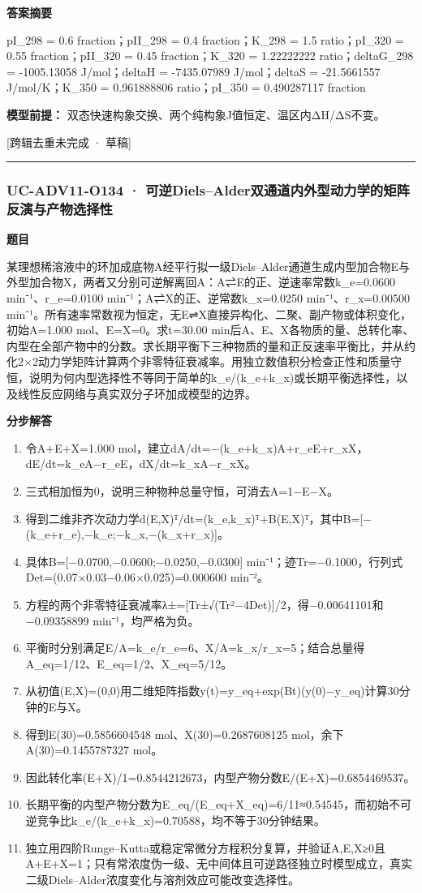 \documentclass[UTF8,11pt,a4paper]{ctexart}
\begin{document}
\noindent\textbf{答案摘要}\par
pI\_298 = 0.6 fraction；pII\_298 = 0.4 fraction；K\_298 = 1.5 ratio；pI\_320 = 0.55 fraction；pII\_320 = 0.45 fraction；K\_320 = 1.22222222 ratio；deltaG\_298 = -1005.13058 J/mol；deltaH = -7435.07989 J/mol；deltaS = -21.5661557 J/mol/K；K\_350 = 0.961888806 ratio；pI\_350 = 0.490287117 fraction\par
\noindent\textbf{模型前提：}
双态快速构象交换、两个纯构象J值恒定、温区内ΔH/ΔS不变。\par
\noindent\textcolor{red!65!black}{[跨辑去重未完成 · 草稿]} \par
\medskip\hrule\medskip
{}
\subsubsection*{UC-ADV11-O134 · 可逆Diels–Alder双通道内外型动力学的矩阵反演与产物选择性}
\noindent\textbf{题目}\par
某理想稀溶液中的环加成底物A经平行拟一级Diels–Alder通道生成内型加合物E与外型加合物X，两者又分别可逆解离回A：A⇌E的正、逆速率常数k\_e=0.0600 min⁻¹、r\_e=0.0100 min⁻¹；A⇌X的正、逆常数k\_x=0.0250 min⁻¹、r\_x=0.00500 min⁻¹。所有速率常数视为恒定，无E⇌X直接异构化、二聚、副产物或体积变化，初始A=1.000 mol、E=X=0。求t=30.00 min后A、E、X各物质的量、总转化率、内型在全部产物中的分数。求长期平衡下三种物质的量和正反速率平衡比，并从约化2×2动力学矩阵计算两个非零特征衰减率。用独立数值积分检查正性和质量守恒，说明为何内型选择性不等同于简单的k\_e/(k\_e+k\_x)或长期平衡选择性，以及线性反应网络与真实双分子环加成模型的边界。\par
\medskip\noindent\textbf{分步解答}
\begin{enumerate}
\item 令A+E+X=1.000 mol，建立dA/dt=−(k\_e+k\_x)A+r\_eE+r\_xX，dE/dt=k\_eA−r\_eE，dX/dt=k\_xA−r\_xX。
\item 三式相加恒为0，说明三种物种总量守恒，可消去A=1−E−X。
\item 得到二维非齐次动力学d(E,X)ᵀ/dt=(k\_e,k\_x)ᵀ+B(E,X)ᵀ，其中B=[−(k\_e+r\_e),−k\_e;−k\_x,−(k\_x+r\_x)]。
\item 具体B=[−0.0700,−0.0600;−0.0250,−0.0300] min⁻¹；迹Tr=−0.1000，行列式Det=(0.07×0.03−0.06×0.025)=0.000600 min⁻²。
\item 方程的两个非零特征衰减率λ±=[Tr±√(Tr²−4Det)]/2，得−0.00641101和−0.09358899 min⁻¹，均严格为负。
\item 平衡时分别满足E/A=k\_e/r\_e=6、X/A=k\_x/r\_x=5；结合总量得A\_eq=1/12、E\_eq=1/2、X\_eq=5/12。
\item 从初值(E,X)=(0,0)用二维矩阵指数y(t)=y\_eq+exp(Bt)(y(0)−y\_eq)计算30分钟的E与X。
\item 得到E(30)=0.5856604548 mol、X(30)=0.2687608125 mol，余下A(30)=0.1455787327 mol。
\item 因此转化率(E+X)/1=0.8544212673，内型产物分数E/(E+X)=0.6854469537。
\item 长期平衡的内型产物分数为E\_eq/(E\_eq+X\_eq)=6/11≈0.54545，而初始不可逆竞争比k\_e/(k\_e+k\_x)=0.70588，均不等于30分钟结果。
\item 独立用四阶Runge–Kutta或稳定常微分方程积分复算，并验证A,E,X≥0且A+E+X=1；只有常浓度伪一级、无中间体且可逆路径独立时模型成立，真实二级Diels–Alder浓度变化与溶剂效应可能改变选择性。
\end{enumerate}
\end{document}
